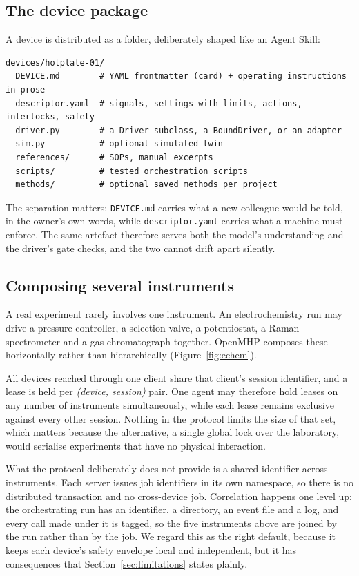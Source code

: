 \documentclass[11pt]{article}
\begin{document}
\subsection{The device package}
A device is distributed as a folder, deliberately shaped like an Agent Skill:

\begin{lstlisting}
devices/hotplate-01/
  DEVICE.md        # YAML frontmatter (card) + operating instructions in prose
  descriptor.yaml  # signals, settings with limits, actions, interlocks, safety
  driver.py        # a Driver subclass, a BoundDriver, or an adapter
  sim.py           # optional simulated twin
  references/      # SOPs, manual excerpts
  scripts/         # tested orchestration scripts
  methods/         # optional saved methods per project
\end{lstlisting}

The separation matters: \texttt{DEVICE.md} carries what a new colleague would be told, in the
owner's own words, while \texttt{descriptor.yaml} carries what a machine must enforce. The
same artefact therefore serves both the model's understanding and the driver's gate checks,
and the two cannot drift apart silently.

\subsection{Composing several instruments}
\label{sec:compose}

A real experiment rarely involves one instrument. An electrochemistry run may drive a
pressure controller, a selection valve, a potentiostat, a Raman spectrometer and a gas
chromatograph together. OpenMHP composes these horizontally rather than hierarchically
(Figure~\ref{fig:echem}).

All devices reached through one client share that client's session identifier, and a lease
is held per \emph{(device, session)} pair. One agent may therefore hold leases on any
number of instruments simultaneously, while each lease remains exclusive against every
other session. Nothing in the protocol limits the size of that set, which matters because
the alternative, a single global lock over the laboratory, would serialise experiments
that have no physical interaction.

What the protocol deliberately does not provide is a shared identifier across instruments.
Each server issues job identifiers in its own namespace, so there is no distributed
transaction and no cross-device job. Correlation happens one level up: the orchestrating
run has an identifier, a directory, an event file and a log, and every call made under it
is tagged, so the five instruments above are joined by the run rather than by the job. We
regard this as the right default, because it keeps each device's safety envelope local and
independent, but it has consequences that Section~\ref{sec:limitations} states plainly.
\end{document}
